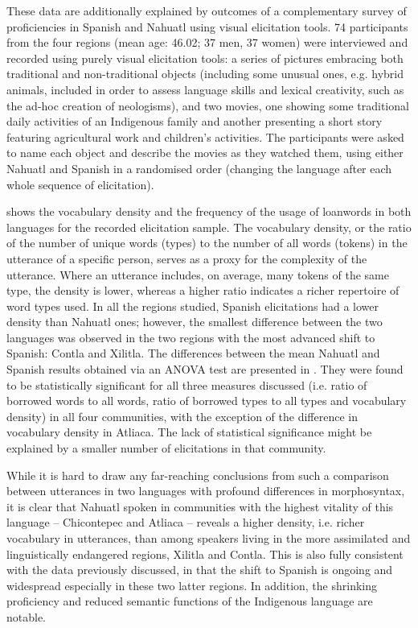 \documentclass[output=paper,hidelinks]{langscibook}
\begin{document}
These data are additionally explained by outcomes of a complementary survey of proficiencies in Spanish and Nahuatl using visual elicitation tools. 74 participants from the four regions (mean age: 46.02; 37 men, 37 women) were interviewed and recorded using purely visual elicitation tools: a series of pictures embracing both traditional and non-traditional objects (including some unusual ones, e.g. hybrid animals, included in order to assess language skills and lexical creativity, such as the ad-hoc creation of neologisms), and two movies, one showing some traditional daily activities of an Indigenous family and another presenting a short story featuring agricultural work and children’s activities. The participants were asked to name each object and describe the movies as they watched them, using either Nahuatl and Spanish in a randomised order (changing the language after each whole sequence of elicitation).

 shows the vocabulary density and the frequency of the usage of loanwords in both languages for the recorded elicitation sample. The vocabulary density, or the ratio of the number of unique words (types) to the number of all words (tokens) in the utterance of a specific person, serves as a proxy for the complexity of the utterance. Where an utterance includes, on average, many tokens of the same type, the density is lower, whereas a higher ratio indicates a richer repertoire of word types used. In all the regions studied, Spanish elicitations had a lower density than Nahuatl ones; however, the smallest difference between the two languages was observed in the two regions with the most advanced shift to Spanish: Contla and Xilitla. The differences between the mean Nahuatl and Spanish results obtained via an ANOVA test are presented in . They were found to be statistically significant for all three measures discussed (i.e. ratio of borrowed words to all words, ratio of borrowed types to all types and vocabulary density) in all four communities, with the exception of the difference in vocabulary density in Atliaca. The lack of statistical significance might be explained by a smaller number of elicitations in that community.

While it is hard to draw any far-reaching conclusions from such a comparison between utterances in two languages with profound differences in morphosyntax, it is clear that Nahuatl spoken in communities with the highest vitality of this language – Chicontepec and Atliaca – reveals a higher density, i.e. richer vocabulary in utterances, than among speakers living in the more assimilated and linguistically endangered regions, Xilitla and Contla. This is also fully consistent with the data previously discussed, in that the shift to Spanish is ongoing and widespread especially in these two latter regions. In addition, the shrinking proficiency and reduced semantic functions of the Indigenous language are notable.
\end{document}
